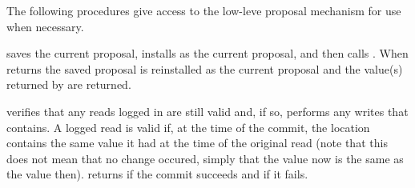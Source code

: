 \documentclass[twoside]{report}
\begin{document}
The following procedures give access to the low-leve proposal mechanism for
 use when necessary.
\begin{protos}
\end{protos}
\noindent
{} saves the current proposal, installs  as
 the current proposal, and then calls .
When  returns the saved proposal is reinstalled as the current
 proposal
 and the value(s) returned by  are returned.

 verifies that any reads logged in  are
 still valid and, if so, performs any writes that  contains.
A logged read is valid if, at the time of the commit, the location contains
 the same value it had at the time of the original read (note that this does
 not mean that no change occured, simply that the value now is the same as
 the value then).
 returns  if the commit succeeds and 
 if it fails.
\end{document}
